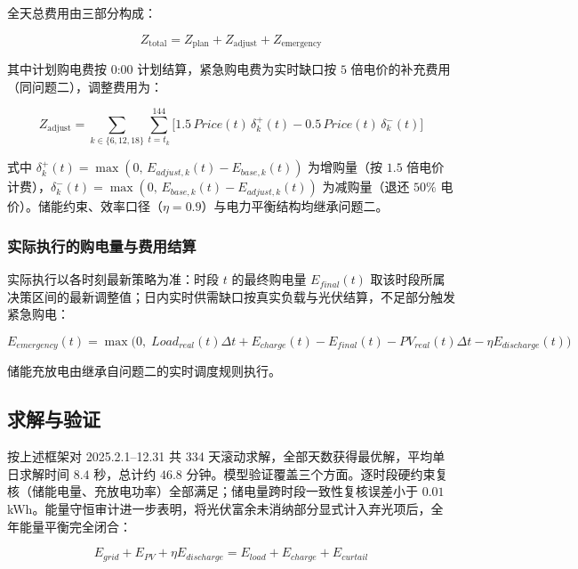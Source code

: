 \documentclass[zihao=-4,a4paper,UTF8,fontset=none]{ctexart}
\begin{document}
全天总费用由三部分构成：

\begin{equation}
  Z_{\mathrm{total}} = Z_{\mathrm{plan}} + Z_{\mathrm{adjust}} + Z_{\mathrm{emergency}}
  \label{eq:q3_obj}
\end{equation}

其中计划购电费按 0:00 计划结算，紧急购电费为实时缺口按 $5$ 倍电价的补充费用（同问题二），调整费用为：

\begin{equation}
  Z_{\mathrm{adjust}} = \sum_{k\in\{6,12,18\}}\sum_{t=t_k}^{144}\Big[
    1.5\, Price(t)\,\delta_k^{+}(t) - 0.5\, Price(t)\,\delta_k^{-}(t)\Big]
  \label{eq:q3_adjust}
\end{equation}

式中 $\delta_k^{+}(t)=\max(0,\,E_{adjust,k}(t)-E_{base,k}(t))$ 为增购量（按 $1.5$ 倍电价计费），$\delta_k^{-}(t)=\max(0,\,E_{base,k}(t)-E_{adjust,k}(t))$ 为减购量（退还 $50\%$ 电价）。储能约束、效率口径（$\eta=0.9$）与电力平衡结构均继承问题二。

\subsubsection{实际执行的购电量与费用结算}

实际执行以各时刻最新策略为准：时段 $t$ 的最终购电量 $E_{final}(t)$ 取该时段所属决策区间的最新调整值；日内实时供需缺口按真实负载与光伏结算，不足部分触发紧急购电：

\begin{equation}
  E_{emergency}(t) = \max\Big(0,\;
  Load_{real}(t)\Delta t + E_{charge}(t) - E_{final}(t) - PV_{real}(t)\Delta t - \eta E_{discharge}(t)\Big)
  \label{eq:q3_emg}
\end{equation}

储能充放电由继承自问题二的实时调度规则执行。

\subsection{求解与验证}

按上述框架对 2025.2.1--12.31 共 334 天滚动求解，全部天数获得最优解，平均单日求解时间 $8.4$ 秒，总计约 $46.8$ 分钟。模型验证覆盖三个方面。逐时段硬约束复核（储能电量、充放电功率）全部满足；储电量跨时段一致性复核误差小于 $0.01$ kWh。能量守恒审计进一步表明，将光伏富余未消纳部分显式计入弃光项后，全年能量平衡完全闭合：

\begin{equation}
  E_{grid} + E_{PV} + \eta E_{discharge} = E_{load} + E_{charge} + E_{curtail}
  \label{eq:q3_balance}
\end{equation}
\end{document}

